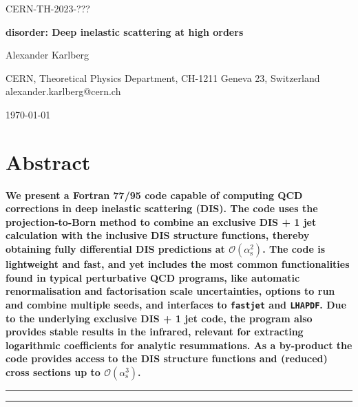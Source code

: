 \documentclass[submission, PhysCodeb]{SciPost}
\newcommand{\as}{\alpha_{\mathrm{s}}}
\begin{document}
\begin{flushright}
CERN-TH-2023-???
\end{flushright}
\begin{center}{\Large \textbf{
disorder: Deep inelastic scattering at high orders\\
}}\end{center}

\begin{center}
Alexander Karlberg
\end{center}

\begin{center}
CERN, Theoretical Physics Department, CH-1211 Geneva 23, Switzerland
\\
{\small \sf alexander.karlberg@cern.ch}
\end{center}

\begin{center}
\today
\end{center}


\section*{Abstract}
{\bf
We present a Fortran 77/95 code capable of computing QCD corrections
in deep inelastic scattering (DIS). The code uses the
projection-to-Born method to combine an exclusive DIS + 1 jet
calculation with the inclusive DIS structure functions, thereby
obtaining fully differential DIS predictions at
$\mathcal{O}(\as^2)$. The code is lightweight and fast, and yet
includes the most common functionalities found in typical perturbative
QCD programs, like automatic renormalisation and factorisation scale
uncertainties, options to run and combine multiple seeds, and
interfaces to {\tt fastjet} and {\tt LHAPDF}. Due to the underlying
exclusive DIS + 1 jet code, the program also provides stable results
in the infrared, relevant for extracting logarithmic coefficients for
analytic resummations. As a by-product the code provides access
to the DIS structure functions and (reduced) cross sections up to
$\mathcal{O}(\as^3)$.}


\vspace{10pt}
\noindent\rule{\textwidth}{1pt}
\tableofcontents\thispagestyle{fancy}
\noindent\rule{\textwidth}{1pt}
\vspace{10pt}
\end{document}
